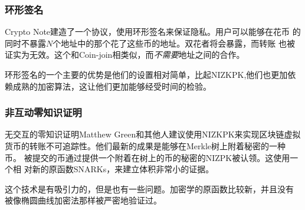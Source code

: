 \documentclass[letterpaper]{article}
\begin{document}
\subsubsection{环形签名}
Crypto Note建造了一个协议，使用环形签名来保证隐私。用户可以能够在花币
的同时不暴露$N$个地址中的那个花了这些币的地址。双花者将会暴露，而转账
也被证实为无效。这个和Coin-join相类似，而\emph{不需要}地址之间的合作。

环形签名的一个主要的优势是他们的设置相对简单，比起NIZKPK,他们也更加依
赖成熟的加密算法，这让他们更加能够经受时间的检验。


\subsubsection{非互动零知识证明}
无交互的零知识证明Matthew Green和其他人建议使用NIZKPK来实现区块链虚拟
货币的转账不可追踪性。他们最新的成果是能够在Merkle树上附着秘密的一种币。
被提交的币通过提供一个附着在树上的币的秘密的NIZPK被认领。这使用一个相
对新的原函数SNARKs，来建立体积非常小的证据。

这个技术是有吸引力的，但是也有一些问题。加密学的原函数比较新，并且没有
被像椭圆曲线加密法那样被严密地验证过。
\end{document}
